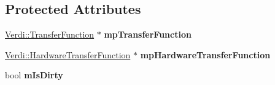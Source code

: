 \subsection*{\-Protected \-Attributes}
\begin{DoxyCompactItemize}
\item 
\hypertarget{class_transfer_function_variable_adf56286273cab440abf59133265b1dcc}{\hyperlink{class_verdi_1_1_transfer_function}{\-Verdi\-::\-Transfer\-Function} $\ast$ {\bfseries mp\-Transfer\-Function}}\label{class_transfer_function_variable_adf56286273cab440abf59133265b1dcc}

\item 
\hypertarget{class_transfer_function_variable_a9b471ff1d69164bae98f1a8d596fae23}{\hyperlink{class_verdi_1_1_hardware_transfer_function}{\-Verdi\-::\-Hardware\-Transfer\-Function} $\ast$ {\bfseries mp\-Hardware\-Transfer\-Function}}\label{class_transfer_function_variable_a9b471ff1d69164bae98f1a8d596fae23}

\item 
\hypertarget{class_transfer_function_variable_a784f7c6742d1c0b349ab05b7b734ffe8}{bool {\bfseries m\-Is\-Dirty}}\label{class_transfer_function_variable_a784f7c6742d1c0b349ab05b7b734ffe8}

\end{DoxyCompactItemize}



